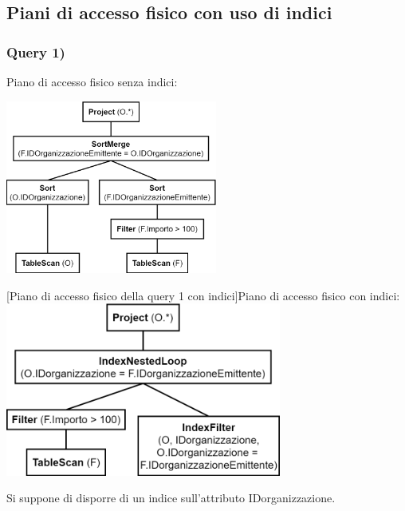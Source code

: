 \documentclass[a4paper,12pt]{article}
\begin{document}
 \subsection{ Piani di accesso fisico con uso di indici }

 \subsubsection{ Query 1) }

\vspace{-0.3cm}\hspace{-0.7cm}
\begin{minipage}{\textwidth}
\begin{multicols}{2}

\null \vfill
Piano di accesso fisico senza indici:

\vspace{0.3cm}\includegraphics[height=5.7cm]{ Albero fisico 1.png }
\vfill \null

\columnbreak

 [Piano di accesso fisico della query 1 con indici]{Piano di accesso fisico con indici:}
\includegraphics[height=5.7cm]{ Albero fisico indici 1.png }

Si suppone di disporre di un indice sull'attributo IDorganizzazione.

\end{multicols}
\end{minipage}
\end{document}
